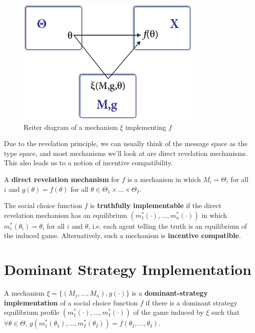 \documentclass[10pt]{article}
\begin{document}
\begin{spacing}{1.0}
\begin{figure}[ht!]
  \centering
  \includegraphics[width=.45\columnwidth]{reiterdiagram}
    \caption{Reiter diagram of a
  mechanism $\xi$ implementing $f$}
\label{reiterdiagram}
\end{figure}

Due to the revelation principle, we can usually think of
the message space as the type space, and most mechanisms
we'll look at are direct revelation mechanisms. This also
leads us to a notion of incentive compatibility.

\begin{definition}
  A \textbf{direct revelation mechanism} for $f$ is a mechanism
  in which $M_i = \Theta_i$ for all $i$ and $g(\theta) =
  f(\theta)$ for all $\theta \in \Theta_1 \times \ldots
  \times \Theta_I$.
\end{definition}

\begin{definition}
  The social choice function $f$ is \textbf{truthfully
    implementable} if the direct revelation mechanism has
  an equilibrium $(m_1^*(\cdot), \ldots, m_n^*(\cdot))$
  in which $m_i^*(\theta_i) = \theta_i$ for all $i$ and
  $\theta$, i.e. each agent telling the truth is an
  equilibrium of the induced game. Alternatively, such a
  mechanism is \textbf{incentive compatible}.
\end{definition}

\section{Dominant Strategy Implementation}
\label{sec:domin-strat-impl}

\begin{definition}
  A mechanism $\xi = \{(M_1, \ldots, M_n),
  g(\cdot)\}$ is a \textbf{dominant-strategy
    implementation} of a social choice function $f$ if
  there is a dominant strategy equilibrium profile
  $(m_1^*(\cdot), \ldots, m_I^*(\cdot))$ of the game
  induced by $\xi$ such that $\forall \theta \in \Theta$,
  $g(m_1^*(\theta_1), \ldots, m_I^*(\theta_I)) =
  f(\theta_1, \ldots, \theta_I)$.
\end{definition}


\end{spacing}
\end{document}
